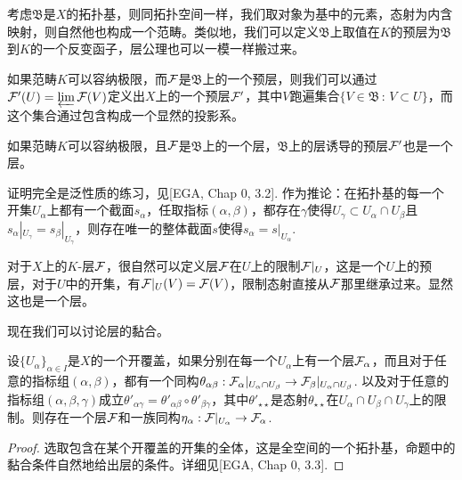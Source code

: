 \begin{para}
考虑$\mathfrak{B}$是$X$的拓扑基，则同拓扑空间一样，我们取对象为基中的元素，态射为内含映射，则自然他也构成一个范畴。类似地，我们可以定义$\mathfrak{B}$上取值在$K$的预层为$\mathfrak{B}$到$K$的一个反变函子，层公理也可以一模一样搬过来。

如果范畴$K$可以容纳极限，而$\mathcal{F}$是$\mathfrak{B}$上的一个预层，则我们可以通过$\mathcal{F}'(U)=\varprojlim \mathcal{F}(V)$定义出$X$上的一个预层$\mathcal{F}'$，其中$V$跑遍集合$\{V\in \mathfrak{B}\,:\, V\subset U\}$，而这个集合通过包含构成一个显然的投影系。
\end{para}

\begin{pro}\label{psgl}
如果范畴$K$可以容纳极限，且$\mathcal{F}$是$\mathfrak{B}$上的一个层，$\mathfrak{B}$上的层诱导的预层$\mathcal{F}'$也是一个层。
\end{pro}

证明完全是泛性质的练习，见[EGA, Chap 0, 3.2]. 作为推论：在拓扑基的每一个开集$U_\alpha$上都有一个截面$s_\alpha$，任取指标$(\alpha,\beta)$，都存在$\gamma$使得$U_\gamma\subset U_\alpha\cap U_\beta$且$s_\alpha|_{U_\gamma}=s_\beta|_{U_\gamma}$，则存在唯一的整体截面$s$使得$s_\alpha=s|_{U_\alpha}$.

\begin{para}
对于$X$上的$K$-层$\mathcal{F}$，很自然可以定义层$\mathcal{F}$在$U$上的限制$\mathcal{F}|_U$，这是一个$U$上的预层，对于$U$中的开集，有$\mathcal{F}|_U(V)=\mathcal{F}(V)$，限制态射直接从$\mathcal{F}$那里继承过来。显然这也是一个层。
\end{para}

现在我们可以讨论层的黏合。

\begin{pro}
设$\{U_\alpha\}_{\alpha \in I}$是$X$的一个开覆盖，如果分别在每一个$U_\alpha$上有一个层$\mathcal{F}_\alpha$，而且对于任意的指标组$(\alpha,\beta)$，都有一个同构$\theta_{\alpha\beta}:\mathcal{F}_\alpha|_{U_\alpha\cap U_\beta}\to \mathcal{F}_\beta|_{U_\alpha\cap U_\beta}$. 以及对于任意的指标组$(\alpha,\beta,\gamma)$成立$\theta'_{\alpha\gamma}=\theta'_{\alpha\beta}\circ \theta'_{\beta\gamma}$，其中$\theta'_{\star\star}$是态射$\theta_{\star\star}$在$U_\alpha\cap U_\beta \cap U_\gamma$上的限制。则存在一个层$\mathcal{F}$和一族同构$\eta_\alpha:\mathcal{F}|_{U_\alpha}\to \mathcal{F}_\alpha$.
\end{pro}

\begin{proof}
选取包含在某个开覆盖的开集的全体，这是全空间的一个拓扑基，命题中的黏合条件自然地给出层的条件。详细见[EGA, Chap 0, 3.3].
\end{proof}

